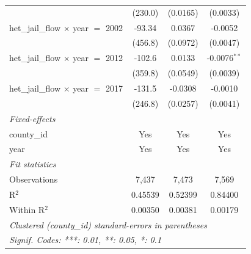 \begin{tabular}{lccc}
                                                         & (230.0)                          & (0.0165)                     & (0.0033)\\   
   het\_jail\_flow $\times$ year $=$ 2002                & -93.34                           & 0.0367                       & -0.0052\\   
                                                         & (456.8)                          & (0.0972)                     & (0.0047)\\   
   het\_jail\_flow $\times$ year $=$ 2012                & -102.6                           & 0.0133                       & -0.0076$^{**}$\\   
                                                         & (359.8)                          & (0.0549)                     & (0.0039)\\   
   het\_jail\_flow $\times$ year $=$ 2017                & -131.5                           & -0.0308                      & -0.0010\\   
                                                         & (246.8)                          & (0.0257)                     & (0.0041)\\   
   \midrule
   \emph{Fixed-effects}\\
   county\_id                                            & Yes                              & Yes                          & Yes\\  
   year                                                  & Yes                              & Yes                          & Yes\\  
   \midrule
   \emph{Fit statistics}\\
   Observations                                          & 7,437                            & 7,473                        & 7,569\\  
   R$^2$                                                 & 0.45539                          & 0.52399                      & 0.84400\\  
   Within R$^2$                                          & 0.00350                          & 0.00381                      & 0.00179\\  
   \midrule \midrule
   \multicolumn{4}{l}{\emph{Clustered (county\_id) standard-errors in parentheses}}\\
   \multicolumn{4}{l}{\emph{Signif. Codes: ***: 0.01, **: 0.05, *: 0.1}}\\
\end{tabular}
\par\endgroup


